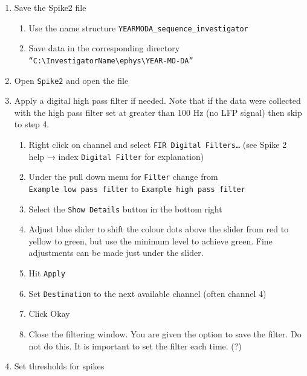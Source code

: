 \documentclass[
]{book}
\providecommand{\tightlist}{%
  \setlength{\itemsep}{0pt}\setlength{\parskip}{0pt}}
\begin{document}
\begin{enumerate}
\def\labelenumi{\arabic{enumi}.}
\tightlist
\item
  Save the Spike2 file

  \begin{enumerate}
  \def\labelenumii{\arabic{enumii}.}
  \tightlist
  \item
    Use the name structure \texttt{YEARMODA\_sequence\_investigator}
  \item
    Save data in the corresponding directory
    \texttt{“C:\textbackslash{}InvestigatorName\textbackslash{}ephys\textbackslash{}YEAR-MO-DA”}
  \end{enumerate}
\item
  Open \texttt{Spike2} and open the file
\item
  Apply a digital high pass filter if needed. Note that if the data were
  collected with the high pass filter set at greater than 100 Hz (no LFP
  signal) then skip to step 4.

  \begin{enumerate}
  \def\labelenumii{\arabic{enumii}.}
  \tightlist
  \item
    Right click on channel and select \texttt{FIR\ Digital\ Filters…} (see Spike 2
    help → index \texttt{Digital\ Filter} for explanation)
  \item
    Under the pull down menu for \texttt{Filter} change from
    \texttt{Example\ low\ pass\ filter} to \texttt{Example\ high\ pass\ filter}
  \item
    Select the \texttt{Show\ Details} button in the bottom right
  \item
    Adjust blue slider to shift the colour dots above the slider from red to
    yellow to green, but use the minimum level to achieve green. Fine
    adjustments can be made just under the slider.
  \item
    Hit \texttt{Apply}
  \item
    Set \texttt{Destination} to the next available channel (often channel 4)
  \item
    Click Okay
  \item
    Close the filtering window. You are given the option to save the filter.
    Do not do this. It is important to set the filter each time. (?)
  \end{enumerate}
\item
  Set thresholds for spikes


\end{enumerate}
\end{document}
